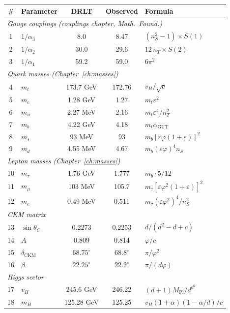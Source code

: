 \documentclass[12pt]{article}
\theoremstyle{remark}
\theoremstyle{definition}
\begin{document}
\begin{center}
\small
\begin{tabular}{clccl}
\hline
\# & Parameter & DRLT & Observed & Formula \\
\hline
\multicolumn{5}{l}{\emph{Gauge couplings (couplings chapter, \textit{Math.\ Found.})}} \\
1 & $1/\alpha_3$ & 8.0 & 8.47 & $(n_S^2-1) \times S(1)$ \\
2 & $1/\alpha_2$ & 30.0 & 29.6 & $12\,n_T \times S(2)$ \\
3 & $1/\alpha_1$ & 59.2 & 59.0 & $6\pi^2$ \\
\hline
\multicolumn{5}{l}{\emph{Quark masses (Chapter~\ref{ch:masses})}} \\
4 & $m_t$ & 173.7 GeV & 172.76 & $v_H/\sqrt{c}$ \\
5 & $m_c$ & 1.28 GeV & 1.27 & $m_t\varepsilon^2$ \\
6 & $m_u$ & 2.27 MeV & 2.16 & $m_t\varepsilon^4/n_T^2$ \\
7 & $m_b$ & 4.22 GeV & 4.18 & $m_t\alpha_\text{GUT}$ \\
8 & $m_s$ & 93 MeV & 93 & $m_b[\varepsilon\varphi(1\!+\!\varepsilon)]^2$ \\
9 & $m_d$ & 4.55 MeV & 4.67 & $m_b(\varepsilon\varphi)^4 n_S$ \\
\hline
\multicolumn{5}{l}{\emph{Lepton masses (Chapter~\ref{ch:masses})}} \\
10 & $m_\tau$ & 1.76 GeV & 1.777 & $m_b \cdot 5/12$ \\
11 & $m_\mu$ & 103 MeV & 105.7 & $m_\tau[\varepsilon\varphi^2(1\!+\!\varepsilon)]^2$ \\
12 & $m_e$ & 0.49 MeV & 0.511 & $m_\tau(\varepsilon\varphi^2)^4/n_S^2$ \\
\hline
\multicolumn{5}{l}{\emph{CKM matrix}} \\
13 & $\sin\theta_C$ & 0.2273 & 0.2253 & $d/(d^2\!-\!d\!+\!c)$ \\
14 & $A$ & 0.809 & 0.814 & $\varphi/c$ \\
15 & $\delta_\text{CKM}$ & $68.75^\circ$ & $68.8^\circ$ & $\pi/\varphi^2$ \\
16 & $\beta$ & $22.25^\circ$ & $22.2^\circ$ & $\pi/(d\varphi)$ \\
\hline
\multicolumn{5}{l}{\emph{Higgs sector}} \\
17 & $v_H$ & 245.6 GeV & 246.22 & $(d\!+\!1)M_\text{Pl}/d^{d^2}$ \\
18 & $m_H$ & 125.28 GeV & 125.25 & $v_H(1\!+\!\alpha)(1\!-\!\alpha/d)/c$ \\

\end{tabular}
\end{center}
\end{document}
